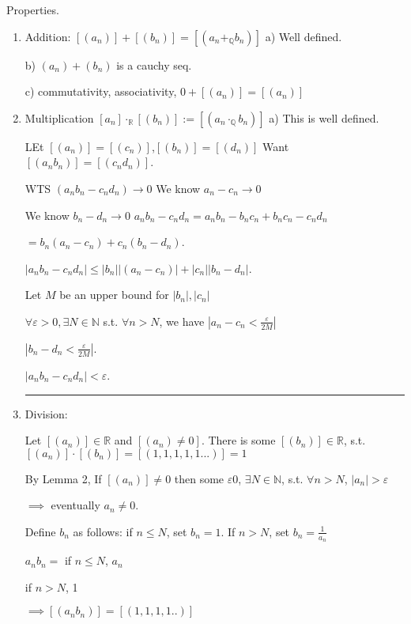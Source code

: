 \documentclass[twoside]{article}
\newcommand{\N}{\mathbb{N}}
\newcommand{\Q}{\mathbb{Q}}
\newenvironment{proof}{{\bf Proof:}}{\hfill\rule{2mm}{2mm}}
\newcommand\R{\mathbb{R}}
\begin{document}
Properties.
\begin{enumerate}
    \item Addition: $[(a_n)] + [(b_n)] = [(a_n +_{\Q} b_n)]$
    a) Well defined. 

    b) $(a_n) + (b_n)$ is a cauchy seq. 

    c) commutativity, associativity, $0+[(a_n)] = [(a_n)]$

    \item Multiplication $[a_n]\cdot_{\R}[(b_n)] := [(a_n \cdot_{\Q} b_n)]$
    a) This is well defined. 

    \begin{proof}
        LEt $[(a_n)] = [(c_n)]$,$[(b_n)] = [(d_n)]$ 
        Want $[(a_nb_n)] = [(c_nd_n)]$. 

        WTS $(a_nb_n - c_nd_n) \rightarrow 0$ 
        We know $a_n - c_n \rightarrow 0$

        We know $b_n - d_n \rightarrow 0$
        $a_nb_n - c_nd_n = a_nb_n - b_nc_n + {b_nc_n - c_nd_n}$

        $= b_n(a_n-c_n) + c_n(b_n-d_n)$. 

        $|a_nb_n - c_nd_n| \leq |b_n||(a_n - c_n)| + |c_n||b_n - d_n|$. 

        Let $M$ be an upper bound for $|b_n|, |c_n|$

        $\forall \varepsilon > 0, \exists N \in \N$ s.t. $\forall n > N$, we have $|a_n - c_n < \frac\varepsilon{2M}|$

        $|b_n - d_n < \frac\varepsilon{2M}|$. 

        $|a_nb_n - c_nd_n| < \varepsilon$. 
    \end{proof}

    \item Division: 
    
    Let $[(a_n)] \in \R$ and $[(a_n) \neq 0]$. There is some $[(b_n)] \in \R$, s.t. $[(a_n)] \cdot [(b_n)] = [(1,1,1,1,1...)] = 1$

    By Lemma 2, If $[(a_n)] \neq 0$ then some $\varepsilon 0$, $\exists N \in \N$, s.t. $\forall n > N$, $|a_n| > \varepsilon$

    $\implies$ eventually $a_n \neq 0$. 

    Define $b_n$ as follows: if $n \leq N$, set $b_n = 1$. If $n > N$, set $b_n = \frac1{a_n}$

    $a_nb_n =$ if $n \leq N$, $a_n$ 

    if $n > N$, 1 

    $\implies [(a_nb_n)] = [(1,1,1,1..)]$


\end{enumerate}
\end{document}
